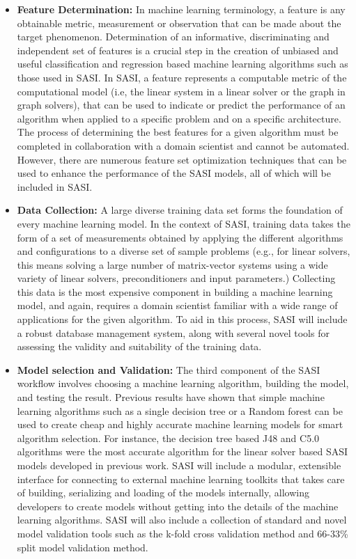 \begin{itemize}
 \item {\bf Feature Determination:} In machine learning terminology, a feature is any obtainable metric, measurement or observation that can be made about the target phenomenon. Determination of an informative, discriminating and independent set of features is a crucial step in the creation of unbiased and useful classification and regression based machine learning algorithms such as those used in SASI.  In SASI, a feature represents a computable metric of the computational model (i.e, the linear system in a linear solver or the graph in graph solvers), that can be used to indicate or predict the performance of an algorithm when applied to a specific problem and on a specific architecture. The process of determining the best features for a given algorithm must be completed in collaboration with a domain scientist and cannot be automated. However, there are numerous feature set optimization techniques that can be used to enhance the performance of the SASI models, all of which will be included in SASI.  
 
 \item {\bf Data Collection:} A large diverse training data set forms the foundation of every machine learning model. In the context of SASI, training data takes the form of a set of measurements obtained by applying the different algorithms and configurations to a diverse set of sample problems (e.g., for linear solvers, this means solving a large number of matrix-vector systems using a wide variety of linear solvers, preconditioners and input parameters.) Collecting this data is the most expensive component in building a machine learning model, and again, requires a domain scientist familiar with a wide range of applications for the given algorithm. To aid in this process, SASI will include a robust database management system, along with several novel tools for assessing the validity and suitability of the training data.  
 
 \item {\bf Model selection and Validation:} The third component of the SASI workflow involves choosing a machine learning algorithm, building the model, and testing the result. Previous results have shown that simple machine learning algorithms such as a single decision tree or a Random forest can be used to create cheap and highly accurate machine learning models for smart algorithm selection. For instance, the decision tree based J48 and C5.0 algorithms were the most accurate algorithm for the linear solver based SASI models developed in previous work. SASI will include a modular, extensible interface for connecting to external machine learning toolkits that takes care of building, serializing and loading of the models internally, allowing developers to create models without getting into the details of the machine learning algorithms. SASI will also include a collection of standard and novel model validation tools such as the k-fold cross validation method and 66-33\% split model validation method.    
 

\end{itemize}
